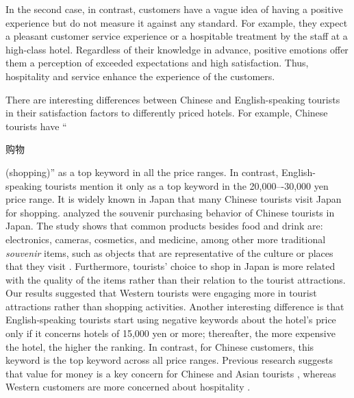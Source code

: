 \documentclass[smallextended,natbib]{svjour3}       %
\providecommand{\DIFadd}[1]{{\protect\color{blue}\uwave{#1}}} %
\providecommand{\DIFaddbegin}{} %
\providecommand{\DIFaddend}{} %
\newcommand{\DIFaddincludegraphics}[2][]{{\color{blue}\fbox{\DIFOincludegraphics[#1]{#2}}}} %
\DeclareRobustCommand{\DIFaddbegin}{\DIFOaddbegin \let\includegraphics\DIFaddincludegraphics} %
\DeclareRobustCommand{\DIFaddend}{\DIFOaddend \let\includegraphics\DIFOincludegraphics} %
\begin{document}
    In the second case, in contrast, customers have a vague idea of having a positive experience but do not measure it against any standard. For example, they expect a pleasant customer service experience or a hospitable treatment by the staff at a high-class hotel. Regardless of their knowledge in advance, positive emotions offer them a perception of exceeded expectations and high satisfaction. Thus, hospitality and service enhance the experience of the customers. 

    There are interesting differences between Chinese and English-speaking tourists in their satisfaction factors to differently priced hotels. For example, Chinese tourists have ``\begin{CJK}{UTF8}{gbsn}购物\end{CJK} (shopping)'' as a top keyword in all the price ranges. In contrast, English-speaking tourists mention it only as a top keyword in the 20,000–-30,000 yen price range. It is widely known in Japan that many Chinese tourists visit Japan for shopping. \cite{tsujimoto2017purchasing} analyzed the souvenir purchasing behavior of Chinese tourists in Japan. The study shows that common products besides food and drink are: electronics, cameras, cosmetics, and medicine, among other more traditional \textit{souvenir} items, such as objects that are representative of the culture or places that they visit \cite{japan2014consumption}. Furthermore, \DIFaddbegin \DIFadd{Chinese }\DIFaddend tourists’ choice to shop in Japan is more related with the quality of the items rather than their relation to the tourist attractions. Our results suggested that Western tourists were engaging more in tourist attractions rather than shopping activities. Another interesting difference is that English-speaking tourists start using negative keywords about the hotel's price only if it concerns hotels of 15,000 yen or more; thereafter, the more expensive the hotel, the higher the ranking. In contrast, for Chinese customers, this keyword is the top keyword across all price ranges. Previous research suggests that value for money is a key concern for Chinese and Asian tourists \cite[][]{choi2000,choi2001,truong2009}, whereas Western customers are more concerned about hospitality \cite[][]{kozak2002}.  
\end{document}
